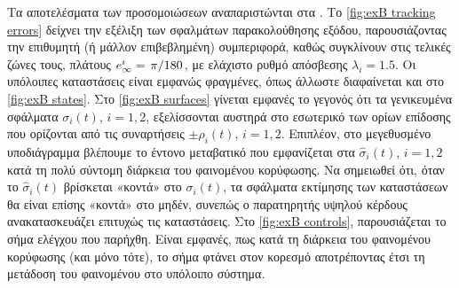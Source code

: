 Τα αποτελέσματα των προσομοιώσεων αναπαριστώνται στα . Το \cref{fig:exB tracking errors} δείχνει την εξέλιξη των σφαλμάτων παρακολούθησης εξόδου, παρουσιάζοντας την επιθυμητή (ή μάλλον επιβεβλημένη) συμπεριφορά, καθώς συγκλίνουν στις τελικές ζώνες τους, πλάτους $e_\infty^i = \flatfrac{\pi}{180}$, με ελάχιστο ρυθμό απόσβεσης $\lambda_i = 1.5$. Οι υπόλοιπες καταστάσεις είναι εμφανώς φραγμένες, όπως άλλωστε διαφαίνεται και στο \cref{fig:exB states}. Στο \cref{fig:exB surfaces} γίνεται εμφανές το γεγονός ότι τα γενικευμένα σφάλματα $\sigma_i(t)$, $i=1,2$, εξελίσσονται αυστηρά στο εσωτερικό των ορίων επίδοσης που ορίζονται από τις συναρτήσεις $\pm \rho_i(t)$, $i=1,2$. Επιπλέον, στο μεγεθυσμένο υποδιάγραμμα βλέπουμε το έντονο μεταβατικό που εμφανίζεται στα $\hat \sigma_i(t)$, $i=1,2$ κατά τη πολύ σύντομη διάρκεια του φαινομένου κορύφωσης. Να σημειωθεί ότι, όταν το $\hat \sigma_i(t)$ βρίσκεται «κοντά» στο $\sigma_i(t)$, τα σφάλματα εκτίμησης των καταστάσεων θα είναι επίσης «κοντά» στο μηδέν, συνεπώς ο παρατηρητής υψηλού κέρδους ανακατασκευάζει επιτυχώς τις καταστάσεις. Στο \cref{fig:exB controls}, παρουσιάζεται το σήμα ελέγχου που παρήχθη. Είναι εμφανές, πως κατά τη διάρκεια του φαινομένου κορύφωσης (και μόνο τότε), το σήμα φτάνει στον κορεσμό αποτρέποντας έτσι τη μετάδοση του φαινομένου στο υπόλοιπο σύστημα.
